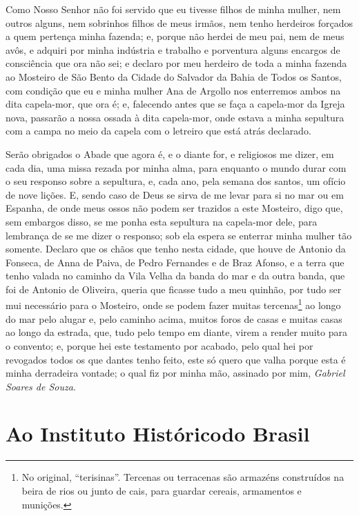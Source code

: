  Como Nosso Senhor não foi servido que eu tivesse filhos de minha
mulher, nem outros alguns, nem sobrinhos filhos de meus irmãos, nem
tenho herdeiros forçados a quem pertença minha fazenda; e, porque não
herdei de meu pai, nem de meus avôs, e adquiri por minha indústria e
trabalho e porventura alguns encargos de consciência que ora não sei; e
declaro por meu herdeiro de toda a minha fazenda ao Mosteiro de São
Bento da Cidade do Salvador da Bahia de Todos os Santos, com condição
que eu e minha mulher Ana de Argollo nos enterremos ambos na dita
capela-mor, que ora é; e, falecendo antes que se faça a capela-mor da
Igreja nova, passarão a nossa ossada à dita capela-mor, onde estava a
minha sepultura com a campa no meio da capela com o letreiro que está atrás
declarado.

Serão obrigados o Abade que agora é, e o diante for, e religiosos me
dizer, em cada dia, uma missa rezada por minha alma, para enquanto o
mundo durar com o seu responso sobre a sepultura, e, cada ano, pela
semana dos santos, um ofício de nove lições. E, sendo caso de Deus se
sirva de me levar para si no mar ou em Espanha, de onde meus ossos não
podem ser trazidos a este Mosteiro, digo que, sem embargos disso, se me
ponha esta sepultura na capela-mor dele, para lembrança de se me dizer
o responso; sob ela espera se enterrar minha mulher tão somente.
Declaro que os chãos que tenho nesta cidade, que houve de Antonio da	\EP[-1]
Fonseca, de Anna de Paiva, de Pedro Fernandes e de Braz Afonso, e a
terra que tenho valada no caminho da Vila Velha da banda do mar e da
outra banda, que foi de Antonio de Oliveira, queria que ficasse tudo a
meu quinhão, por tudo ser mui necessário para o Mosteiro, onde se podem
fazer muitas tercenas\footnote{ No original, “terisinas”. Tercenas ou
terracenas são armazéns construídos na beira de rios ou junto de cais,
para guardar cereais, armamentos e munições.} ao longo do mar pelo
alugar e, pelo caminho acima, muitos foros de casas e muitas casas ao
longo da estrada, que, tudo pelo tempo em diante, virem a render muito
para o convento; e, porque hei este testamento por acabado, pelo qual
hei por revogados todos os que dantes tenho feito, este só quero que
valha porque esta é minha derradeira vontade; o qual fiz por minha mão,
assinado por mim, \textit{Gabriel Soares de Souza}. 


\chapter[Ao Instituto Histórico do Brasil]{Ao Instituto Histórico\break do Brasil}

